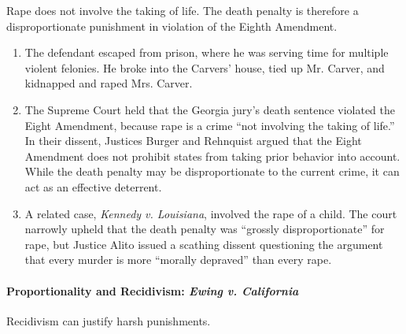 Rape does not involve the taking of life. The death penalty is therefore a 
disproportionate punishment in violation of the Eighth Amendment.

\begin{enumerate}
    \item The defendant escaped from prison, where he was serving time for 
    multiple violent felonies. He broke into the Carvers' house, tied up Mr. 
    Carver, and kidnapped and raped Mrs. Carver.
    \item The Supreme Court held that the Georgia jury's death sentence 
    violated the Eight Amendment, because rape is a crime ``not involving the 
    taking of life.'' In their dissent, Justices Burger and Rehnquist argued 
    that the Eight Amendment does not prohibit states from taking prior 
    behavior into account. While the death penalty may be disproportionate to 
    the current crime, it can act as an effective deterrent.
    \item A related case, \emph{Kennedy v. Louisiana}, involved the rape of a 
    child. The court narrowly upheld that the death penalty was ``grossly 
    disproportionate'' for rape, but Justice Alito issued a scathing dissent 
    questioning the argument that every murder is more ``morally depraved'' 
    than every rape.
\end{enumerate}

\paragraph{Proportionality and Recidivism: \emph{Ewing v. California}}

Recidivism can justify harsh punishments.

